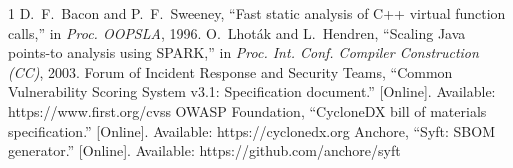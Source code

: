 \documentclass[conference]{IEEEtran}
\begin{document}
\begin{thebibliography}{1}
 D.~F.~Bacon and P.~F.~Sweeney, ``Fast static analysis of C++ virtual function calls,'' in \emph{Proc. OOPSLA}, 1996.
 O.~Lhot\'ak and L.~Hendren, ``Scaling Java points-to analysis using SPARK,'' in \emph{Proc. Int. Conf. Compiler Construction (CC)}, 2003.
 Forum of Incident Response and Security Teams, ``Common Vulnerability Scoring System v3.1: Specification document.'' [Online]. Available: https://www.first.org/cvss
 OWASP Foundation, ``CycloneDX bill of materials specification.'' [Online]. Available: https://cyclonedx.org
 Anchore, ``Syft: SBOM generator.'' [Online]. Available: https://github.com/anchore/syft
\end{thebibliography}
\end{document}
